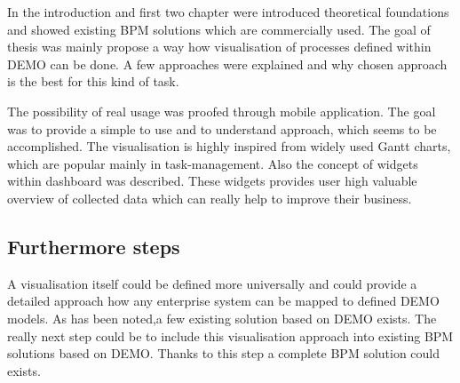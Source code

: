 In the introduction and first two chapter were introduced theoretical foundations and showed existing BPM solutions which are commercially used. The goal of thesis was mainly propose a way how visualisation of processes defined within DEMO can be done. A few approaches were explained and why chosen approach is the best for this kind of task. 

The possibility of real usage was proofed through mobile application. The goal was to provide a simple to use and to understand approach, which seems to be accomplished. The visualisation is highly inspired from widely used Gantt charts, which are popular mainly in task-management. Also the concept of widgets within dashboard was described. These widgets provides user high valuable overview of collected data which can really help to improve their business. 

\subsection{Furthermore steps}
A visualisation itself could be defined more universally and could provide a detailed approach how any enterprise system can be mapped to defined DEMO models. As has been noted,a few existing solution based on DEMO exists. The really next step could be to include this visualisation  approach into existing BPM solutions based on DEMO. Thanks to this step a complete BPM solution could exists.
